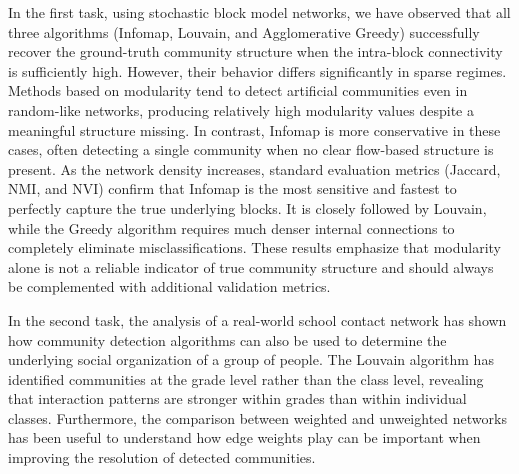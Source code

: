 \documentclass{article}
\begin{document}
In the first task, using stochastic block model networks, we have observed that all three algorithms (Infomap, Louvain, and Agglomerative Greedy) successfully recover the ground-truth community structure when the intra-block connectivity is sufficiently high. However, their behavior differs significantly in sparse regimes. Methods based on modularity tend to detect artificial communities even in random-like networks, producing relatively high modularity values despite a meaningful structure missing. In contrast, Infomap is more conservative in these cases, often detecting a single community when no clear flow-based structure is present. As the network density increases, standard evaluation metrics (Jaccard, NMI, and NVI) confirm that Infomap is the most sensitive and fastest to perfectly capture the true underlying blocks. It is closely followed by Louvain, while the Greedy algorithm requires much denser internal connections to completely eliminate misclassifications. These results emphasize that modularity alone is not a reliable indicator of true community structure and should always be complemented with additional validation metrics.

In the second task, the analysis of a real-world school contact network has shown how community detection algorithms can also be used to determine the underlying social organization of a group of people. The Louvain algorithm has identified communities at the grade level rather than the class level, revealing that interaction patterns are stronger within grades than within individual classes. Furthermore, the comparison between weighted and unweighted networks has been useful to understand how edge weights play can be important when improving the resolution of detected communities.


\newpage


\clearpage


% 
\end{document}
